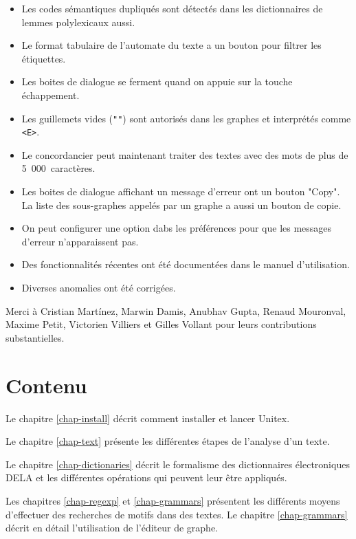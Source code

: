 \begin{itemize}
  \item Les codes sémantiques dupliqués sont détectés dans les dictionnaires de lemmes polylexicaux
  aussi.
  \item Le format tabulaire de l'automate du texte a un bouton pour filtrer les étiquettes.
  \item Les boites de dialogue se ferment quand on appuie sur la touche échappement.
  \item Les guillemets vides (\verb$""$) sont autorisés dans les graphes et interprétés comme
  \verb$<E>$.
  \item Le concordancier peut maintenant traiter des textes avec des mots de plus de
  5~000~caractères.
  \item Les boites de dialogue affichant un message d'erreur ont un bouton "Copy". La liste des
  sous-graphes appelés par un graphe a aussi un bouton de copie.
  \item On peut configurer une option dabs les préférences pour que les messages d'erreur
  n'apparaissent pas.
  \item Des fonctionnalités récentes ont été documentées dans le manuel d'utilisation.
  \item Diverses anomalies ont été corrigées. 
\end{itemize}

\noindent Merci à Cristian Martínez, Marwin Damis, Anubhav Gupta, Renaud Mouronval,
Maxime Petit, Victorien Villiers et Gilles Vollant pour leurs contributions substantielles.


\section*{Contenu}
\noindent Le chapitre \ref{chap-install} décrit comment installer et lancer Unitex.

\bigskip \noindent Le chapitre \ref{chap-text} présente les différentes étapes de l'analyse d'un
texte.

\bigskip \noindent Le chapitre \ref{chap-dictionaries} décrit le formalisme 
des dictionnaires électroniques DELA et les différentes opérations qui peuvent leur être appliqués.

\bigskip \noindent Les chapitres \ref{chap-regexp} et \ref{chap-grammars}
présentent les différents moyens d’effectuer des recherches de motifs dans des textes.
Le chapitre \ref{chap-grammars} décrit en détail l'utilisation de l'éditeur de graphe.

